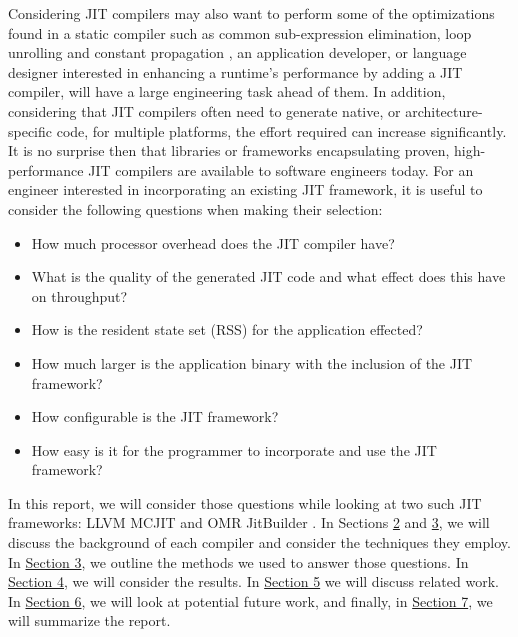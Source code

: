 Considering JIT compilers may also want to perform some of the optimizations found in a static compiler such as common sub-expression elimination, loop unrolling and constant propagation \cite{compilerBook}, an application developer, or language designer interested in enhancing a runtime's performance by adding a JIT compiler, will have a large engineering task ahead of them.
In addition, considering that JIT compilers often need to generate native, or architecture-specific code, for multiple platforms, the effort required can increase significantly.
It is no surprise then that libraries or frameworks encapsulating proven, high-performance JIT compilers are available to software engineers today.
For an engineer interested in incorporating an existing JIT framework, it is useful to consider the following questions when making their selection: 
\begin{itemize}
    \item How much processor overhead does the JIT compiler have?
    \item What is the quality of the generated JIT code and what effect does this have on throughput?
    \item How is the resident state set (RSS) for the application effected?    
    \item How much larger is the application binary with the inclusion of the JIT framework?
    \item How configurable is the JIT framework?
    \item How easy is it for the programmer to incorporate and use the JIT framework?
\end{itemize} 

In this report, we will consider those questions while looking at two such JIT frameworks: LLVM MCJIT \cite{LLVM_Web} and OMR JitBuilder \cite{jitbuilderPaper}.
In Sections \hyperref[sec:llvm]{2} and \hyperref[sec:jitbuilder]{3}, we will discuss the background of each compiler and consider the techniques they employ.
In \hyperref[sec:methodology]{Section 3}, we outline the methods we used to answer those questions.
In \hyperref[sec:results]{Section 4}, we will consider the results.
In \hyperref[sec:related-work]{Section 5} we will discuss related work.
In \hyperref[sec:future-work]{Section 6}, we will look at potential future work, and finally, in \hyperref[sec:summary]{Section 7}, we will summarize the report.
